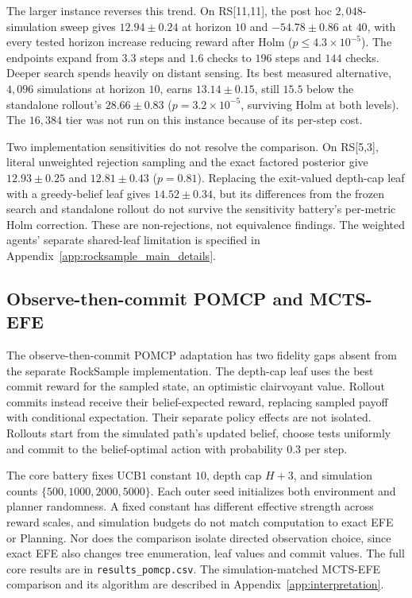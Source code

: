 \documentclass[manuscript, screen, review]{jair}
\begin{document}
The larger instance reverses this trend. On RS[11,11], the post hoc $2{,}048$-simulation sweep gives $12.94\pm0.24$ at horizon $10$ and $-54.78\pm0.86$ at $40$, with every tested horizon increase reducing reward after Holm ($p\le4.3\times10^{-5}$). The endpoints expand from $3.3$ steps and $1.6$ checks to $196$ steps and $144$ checks. Deeper search spends heavily on distant sensing. Its best measured alternative, $4{,}096$ simulations at horizon $10$, earns $13.14\pm0.15$, still $15.5$ below the standalone rollout's $28.66\pm0.83$ ($p=3.2\times10^{-5}$, surviving Holm at both levels). The $16{,}384$ tier was not run on this instance because of its per-step cost.

Two implementation sensitivities do not resolve the comparison. On RS[5,3], literal unweighted rejection sampling and the exact factored posterior give $12.93\pm0.25$ and $12.81\pm0.43$ ($p=0.81$). Replacing the exit-valued depth-cap leaf with a greedy-belief leaf gives $14.52\pm0.34$, but its differences from the frozen search and standalone rollout do not survive the sensitivity battery's per-metric Holm correction. These are non-rejections, not equivalence findings. The weighted agents' separate shared-leaf limitation is specified in Appendix~\ref{app:rocksample_main_details}.

\subsection{Observe-then-commit POMCP and MCTS-EFE}
\label{app:pomcp}

The observe-then-commit POMCP adaptation \citep{silver2010} has two fidelity gaps absent from the separate RockSample implementation. The depth-cap leaf uses the best commit reward for the sampled state, an optimistic clairvoyant value. Rollout commits instead receive their belief-expected reward, replacing sampled payoff with conditional expectation. Their separate policy effects are not isolated. Rollouts start from the simulated path's updated belief, choose tests uniformly and commit to the belief-optimal action with probability $0.3$ per step.

The core battery fixes UCB1 constant $10$, depth cap $H+3$, and simulation counts $\{500,1000,2000,5000\}$. Each outer seed initializes both environment and planner randomness. A fixed constant has different effective strength across reward scales, and simulation budgets do not match computation to exact EFE or Planning. Nor does the comparison isolate directed observation choice, since exact EFE also changes tree enumeration, leaf values and commit values. The full core results are in \texttt{results\_pomcp.csv}. The simulation-matched MCTS-EFE comparison and its algorithm are described in Appendix~\ref{app:interpretation}.
\end{document}
